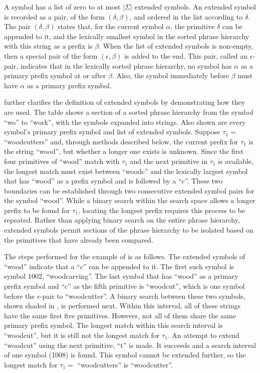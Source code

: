 A symbol has a list of zero to at most $|\Sigma|$ extended 
symbols.  An extended symbol is 
recorded as a pair, of the form 
$(\delta, \beta)$, and ordered in the list according to
$\delta$.  The pair $(\delta, \beta)$ states that, for the 
current symbol $\alpha$, the primitive $\delta$ can be
appended to it, and the lexically smallest symbol 
in the sorted phrase hierarchy with this  
string as a prefix is $\beta$.  When the
list of extended symbols is non-empty, then a special 
pair of the form $(\epsilon, \beta)$ is added to the end.  This
pair, called an $\epsilon$-pair, indicates that in the 
lexically sorted phrase hierarchy,
no symbol has $\alpha$ as a primary prefix symbol at or 
after $\beta$.  Also, the symbol immediately before 
$\beta$ must have $\alpha$ as a primary prefix symbol.

 further clarifies the 
definition of extended symbols by demonstrating how they are
used.  The table shows a section of a sorted phrase hierarchy
from the symbol ``wo'' to ``work'', with the symbols expanded into
strings.  Also shown are every symbol's primary prefix symbol and
list of extended symbols.
Suppose $\tau_1 =$ ``woodcutters'' and, through methods described
below, the current prefix for $\tau_1$ is the string ``wood'', but
whether a longer one exists is unknown.
Since the first four primitives of ``wood'' match with $\tau_1$
and the next primitive in $\tau_1$ is available,
the longest match must exist between ``woodc'' and the lexically
largest symbol that has ``wood'' as a prefix symbol and is followed by a ``c''.  
These two boundaries can be established through two 
consecutive extended symbol pairs for the symbol ``wood''.
While a binary search within the search space allows a longer prefix
to be found for $\tau_1$, locating the longest prefix requires
this process to be repeated.  Rather than applying
binary search on the entire phrase hierarchy, extended symbols permit
sections of the phrase hierarchy to be isolated based on the 
primitives that have already been compared.



The steps performed for the example of 
 is as follows.  
The extended symbols of ``wood'' indicate that a ``c'' can be
appended to it.  The first such symbol is symbol 1002, 
``woodcarving''.  The last symbol that has ``wood'' as a primary
prefix symbol and ``c'' as the fifth primitive is 
``woodcut'', which is one symbol before the
$\epsilon$-pair to ``woodcutter''.  A binary search between
these two symbols, shown shaded in ,
is performed next. 
Within this interval, all of these strings
have the same first five primitives.  However, not all of
them share the same primary prefix symbol.
The longest match within this search interval is
``woodcut'', but it is still not the longest match for $\tau_1$.
An attempt to extend ``woodcut'' using the next primitive, ``t''
is made.  It succeeds and a search interval of one symbol (1008)
is found.  This symbol cannot be
extended further, so the longest match for $\tau_1 =$ ``woodcutters'' is 
``woodcutter''.

